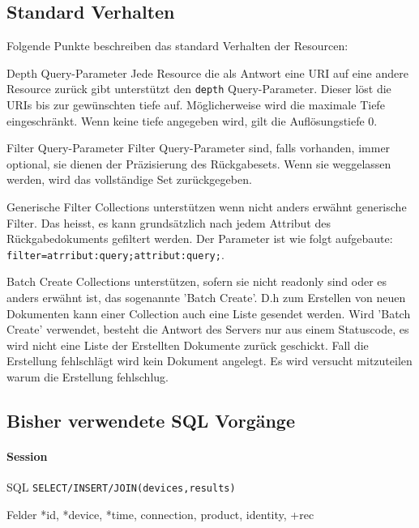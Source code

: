 \documentclass[10pt,a4paper]{scrartcl}
\begin{document}
\subsection{Standard Verhalten}
Folgende Punkte beschreiben das standard Verhalten der Resourcen:
\begin{description*}
    \item[Depth Query-Parameter] Jede Resource die als Antwort eine URI auf eine andere Resource zurück gibt                         unterstützt den \texttt{depth} Query-Parameter. Dieser löst die URIs bis zur gewünschten tiefe auf. Möglicherweise wird die maximale Tiefe eingeschränkt. Wenn keine tiefe angegeben wird, gilt die Auflösungstiefe 0.
    \item[Filter Query-Parameter] Filter Query-Parameter sind, falls vorhanden, immer optional, sie dienen der Präzisierung des Rückgabesets. Wenn sie weggelassen werden, wird das vollständige Set zurückgegeben.
    \item[Generische Filter] Collections unterstützen wenn nicht anders erwähnt generische Filter. Das heisst, es kann grundsätzlich nach jedem Attribut des Rückgabedokuments gefiltert werden. Der Parameter ist wie folgt aufgebaute: \texttt{filter=atrribut:query;attribut:query;}.
    \item[Batch Create] Collections unterstützen, sofern sie nicht readonly sind oder es anders erwähnt ist, das sogenannte 'Batch Create'. D.h zum Erstellen von neuen Dokumenten kann einer Collection auch eine Liste gesendet werden. Wird 'Batch Create' verwendet, besteht die Antwort des Servers nur aus einem Statuscode, es wird nicht eine Liste der Erstellten Dokumente zurück geschickt. Fall die Erstellung fehlschlägt wird kein Dokument angelegt. Es wird versucht mitzuteilen warum die Erstellung fehlschlug.\end{description*}
 
\pagebreak
\subsection{Bisher verwendete SQL Vorgänge}
\paragraph{Session}
\begin{description*}
	\item[SQL] \texttt{SELECT/INSERT/JOIN(devices,results)}
	\item[Felder] *id, *device, *time, connection, product, identity, +rec
\end{description*}
\end{document}
